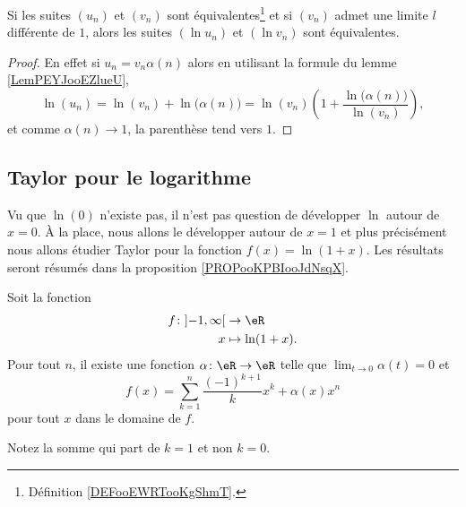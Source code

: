 	\begin{lemma}
		Si les suites \( (u_n)\) et \( (v_n)\) sont équivalentes\footnote{Définition \ref{DEFooEWRTooKgShmT}.} et si \( (v_n)\) admet une limite \( l\) différente de \( 1\), alors les suites \( (\ln u_n)\) et \( (\ln v_n)\) sont équivalentes.
	\end{lemma}

	\begin{proof}
		En effet si \( u_n=v_n\alpha(n)\) alors en utilisant la formule du lemme \ref{LemPEYJooEZlueU},
		\begin{equation}
			\ln(u_n)=\ln(v_n)+\ln\big( \alpha(n) \big)=\ln(v_n)\left( 1+\frac{ \ln\big( \alpha(n) \big) }{ \ln(v_n) } \right),
		\end{equation}
		et comme \( \alpha(n)\to 1\), la parenthèse tend vers \( 1\).
	\end{proof}

	\subsection{Taylor pour le logarithme}

	Vu que \( \ln(0)\) n'existe pas, il n'est pas question de développer \( \ln\) autour de \( x=0\). À la place, nous allons le développer autour de \( x=1\) et plus précisément nous allons étudier Taylor pour la fonction \( f(x)=\ln(1+x)\). Les résultats seront résumés dans la proposition \ref{PROPooKPBIooJdNsqX}.

	\begin{proposition}     \label{PROPooWCUEooJudkCV}
		Soit la fonction
		\begin{equation}
			\begin{aligned}
				f\colon \mathopen] -1 , \infty \mathclose[ & \to \eR           \\
				x                                          & \mapsto \ln(1+x).
			\end{aligned}
		\end{equation}
		Pour tout \( n\), il existe une fonction \( \alpha\colon \eR\to \eR\) telle que \( \lim_{t\to 0} \alpha(t)=0\) et
		\begin{equation}
			f(x)=\sum_{k=1}^n\frac{ (-1)^{k+1} }{ k }x^k+\alpha(x)x^n
		\end{equation}
		pour tout \( x\) dans le domaine de \( f\).

		Notez la somme qui part de \( k=1\) et non \( k=0\).
	\end{proposition}

